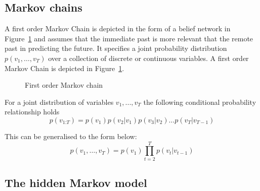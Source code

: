 \subsection{Markov chains}

A first order Markov Chain is depicted in the form of a belief network in Figure~\ref{Ch2Fig:5} and assumes that the immediate past is more relevant that the remote past in predicting the future. It specifies a joint probability distribution $p(v_1,\dots,v_T)$ over a collection of discrete or continuous variables. A first order Markov Chain is depicted in Figure~\ref{Ch2Fig:5}.

\begin{figure}[!ht]\centering
    \caption{First order Markov chain}\label{Ch2Fig:5}
\end{figure}

For a joint distribution of variables $v_1,...,v_T$ the following conditional probability relationship holds \autocite{barberBRML2012}
\begin{equation}
    p{(v_{1\text{:}T})} = p{(v_1)} p {(v_2|v_1)} p{(v_3|v_2)} \dots p{(v_T|v_{T-1})}
\end{equation}

This can be generalised to the form below:
\begin{equation}
    p{(v_1,\dots,v_T)} = p{(v_1)} \prod_{t=2}^{T} p {(v_t|v_{t-1})}
\end{equation}

\subsection{The hidden Markov model}

